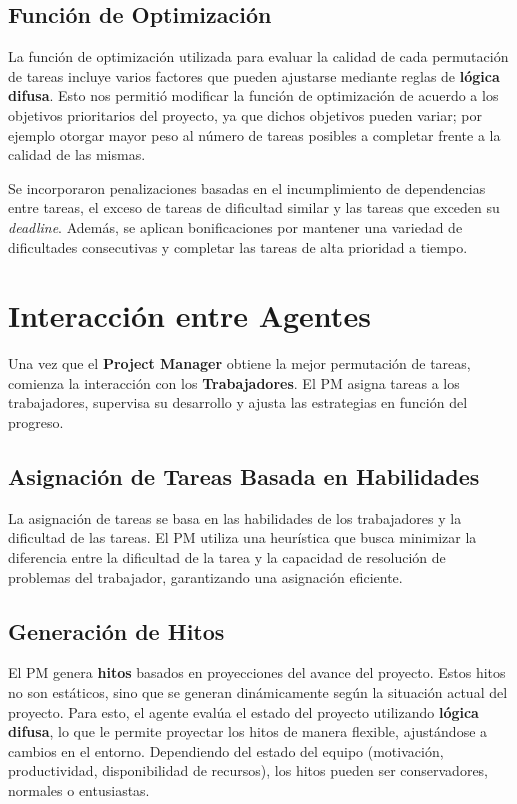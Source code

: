 \documentclass[a4paper, 12pt]{article}
\begin{document}
\subsection{Función de Optimización}
La función de optimización utilizada para evaluar la calidad de cada permutación de tareas incluye varios factores que pueden ajustarse mediante reglas de \textbf{lógica difusa}. Esto nos permitió modificar la funci\'on de optimización de acuerdo a los objetivos prioritarios del proyecto, ya que dichos objetivos pueden variar; por ejemplo otorgar mayor peso al número de tareas posibles a completar frente a la calidad de las mismas.

Se incorporaron penalizaciones basadas en el incumplimiento de dependencias entre tareas, el exceso de tareas de dificultad similar y las tareas que exceden su \textit{deadline}. Además, se aplican bonificaciones por mantener una variedad de dificultades consecutivas y completar las tareas de alta prioridad a tiempo.

\section{Interacción entre Agentes}
Una vez que el \textbf{Project Manager} obtiene la mejor permutación de tareas, comienza la interacción con los \textbf{Trabajadores}. El PM asigna tareas a los trabajadores, supervisa su desarrollo y ajusta las estrategias en función del progreso.

\subsection{Asignación de Tareas Basada en Habilidades}
La asignación de tareas se basa en las habilidades de los trabajadores y la dificultad de las tareas. El PM utiliza una heurística que busca minimizar la diferencia entre la dificultad de la tarea y la capacidad de resolución de problemas del trabajador, garantizando una asignación eficiente.

\subsection{Generación de Hitos}
El PM genera \textbf{hitos} basados en proyecciones del avance del proyecto. Estos hitos no son estáticos, sino que se generan dinámicamente según la situación actual del proyecto. Para esto, el agente evalúa el estado del proyecto utilizando \textbf{lógica difusa}, lo que le permite proyectar los hitos de manera flexible, ajustándose a cambios en el entorno. Dependiendo del estado del equipo (motivación, productividad, disponibilidad de recursos), los hitos pueden ser conservadores, normales o entusiastas.
\end{document}
